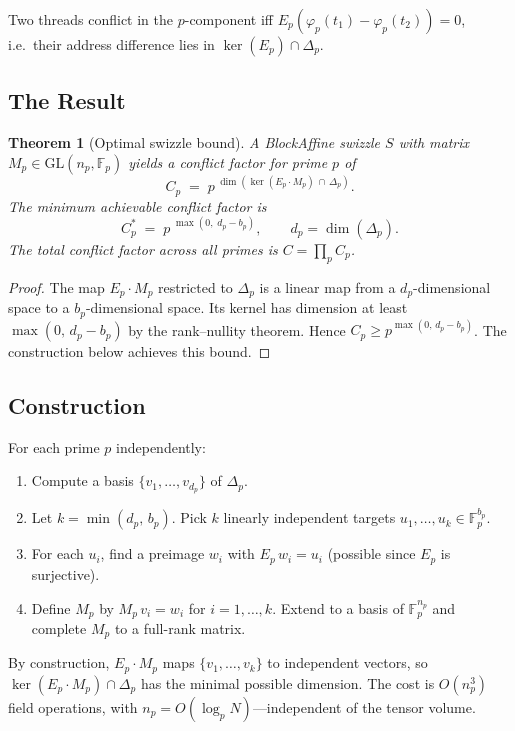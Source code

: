 \documentclass[11pt]{article}
\newtheorem{theorem}{Theorem}
\theoremstyle{definition}
\theoremstyle{remark}
\newcommand{\F}{\mathbb{F}}
\newcommand{\GL}{\mathrm{GL}}
\begin{document}
Two threads conflict in the $p$-component iff $E_p(\varphi_p(t_1) - \varphi_p(t_2)) = 0$, i.e.\ their address difference lies in $\ker(E_p) \cap \Delta_p$.

\subsection*{The Result}

\begin{theorem}[Optimal swizzle bound]
\label{thm:swizzle}
A BlockAffine swizzle $S$ with matrix $M_p \in \GL(n_p, \F_p)$ yields a conflict factor for prime $p$ of
\[
C_p \;=\; p^{\;\dim(\ker(E_p \cdot M_p)\,\cap\,\Delta_p)}.
\]
The minimum achievable conflict factor is
\[
C_p^* \;=\; p^{\;\max(0,\; d_p - b_p)},
\qquad d_p = \dim(\Delta_p).
\]
The total conflict factor across all primes is $C = \prod_p C_p$.
\end{theorem}

\begin{proof}
The map $E_p \cdot M_p$ restricted to $\Delta_p$ is a linear map from a $d_p$-dimensional space to a $b_p$-dimensional space.
Its kernel has dimension at least $\max(0,\, d_p - b_p)$ by the rank--nullity theorem.
Hence $C_p \ge p^{\max(0,\,d_p - b_p)}$.
The construction below achieves this bound.
\end{proof}

\subsection*{Construction}

For each prime $p$ independently:

\begin{enumerate}[nosep]
\item Compute a basis $\{v_1,\ldots,v_{d_p}\}$ of $\Delta_p$.
\item Let $k = \min(d_p,\, b_p)$.
Pick $k$ linearly independent targets $u_1,\ldots,u_k \in \F_p^{b_p}$.
\item For each $u_i$, find a preimage $w_i$ with $E_p\,w_i = u_i$ (possible since $E_p$ is surjective).
\item Define $M_p$ by $M_p\,v_i = w_i$ for $i = 1,\ldots,k$.
Extend to a basis of $\F_p^{n_p}$ and complete $M_p$ to a full-rank matrix.
\end{enumerate}

By construction, $E_p \cdot M_p$ maps $\{v_1,\ldots,v_k\}$ to independent vectors, so $\ker(E_p \cdot M_p) \cap \Delta_p$ has the minimal possible dimension.
The cost is $O(n_p^3)$ field operations, with $n_p = O(\log_p N)$---independent of the tensor volume.
\end{document}

